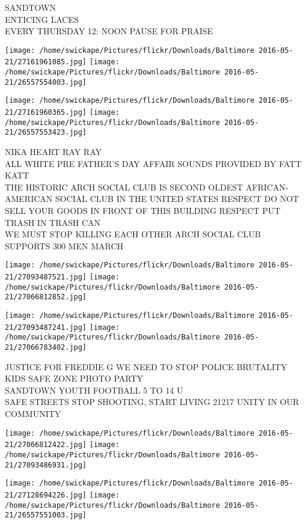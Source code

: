 \documentclass[10pt,letterpaper]{article}
\begin{document}
SANDTOWN\\
ENTICING LACES\\
EVERY THURSDAY 12: NOON PAUSE FOR PRAISE\\
\pagebreak

\texttt{[image: /home/swickape/Pictures/flickr/Downloads/Baltimore 2016-05-21/27161961085.jpg]}
\texttt{[image: /home/swickape/Pictures/flickr/Downloads/Baltimore 2016-05-21/26557554003.jpg]}

\texttt{[image: /home/swickape/Pictures/flickr/Downloads/Baltimore 2016-05-21/27161960365.jpg]}
\texttt{[image: /home/swickape/Pictures/flickr/Downloads/Baltimore 2016-05-21/26557553423.jpg]}

NIKA HEART RAY RAY\\
ALL WHITE PRE FATHER'S DAY AFFAIR SOUNDS PROVIDED BY FATT KATT\\
THE HISTORIC ARCH SOCIAL CLUB IS SECOND OLDEST AFRICAN{-}AMERICAN SOCIAL CLUB IN THE UNITED STATES RESPECT DO NOT SELL YOUR GOODS IN FRONT OF THIS BUILDING RESPECT PUT TRASH IN TRASH CAN\\
WE MUST STOP KILLING EACH OTHER ARCH SOCIAL CLUB SUPPORTS 300 MEN MARCH\\
\pagebreak

\texttt{[image: /home/swickape/Pictures/flickr/Downloads/Baltimore 2016-05-21/27093487521.jpg]}
\texttt{[image: /home/swickape/Pictures/flickr/Downloads/Baltimore 2016-05-21/27066812852.jpg]}

\texttt{[image: /home/swickape/Pictures/flickr/Downloads/Baltimore 2016-05-21/27093487241.jpg]}
\texttt{[image: /home/swickape/Pictures/flickr/Downloads/Baltimore 2016-05-21/27066783402.jpg]}

JUSTICE FOR FREDDIE G WE NEED TO STOP POLICE BRUTALITY\\
KIDS SAFE ZONE PHOTO PARTY\\
SANDTOWN YOUTH FOOTBALL 5 TO 14 U\\
SAFE STREETS STOP SHOOTING, START LIVING 21217 UNITY IN OUR COMMUNITY\\
\pagebreak

\texttt{[image: /home/swickape/Pictures/flickr/Downloads/Baltimore 2016-05-21/27066812422.jpg]}
\texttt{[image: /home/swickape/Pictures/flickr/Downloads/Baltimore 2016-05-21/27093486931.jpg]}

\texttt{[image: /home/swickape/Pictures/flickr/Downloads/Baltimore 2016-05-21/27128694226.jpg]}
\texttt{[image: /home/swickape/Pictures/flickr/Downloads/Baltimore 2016-05-21/26557551003.jpg]}
\end{document}
